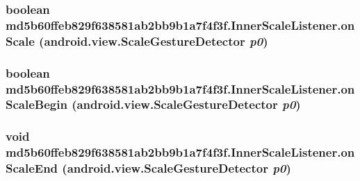 \hypertarget{classmd5b60ffeb829f638581ab2bb9b1a7f4f3f_1_1_inner_scale_listener_9541f867e31a3ee001b6454b9dd02067}{
\subsubsection[{onScale}]{\setlength{\rightskip}{0pt plus 5cm}boolean md5b60ffeb829f638581ab2bb9b1a7f4f3f.InnerScaleListener.onScale (android.view.ScaleGestureDetector {\em p0})}}
\label{classmd5b60ffeb829f638581ab2bb9b1a7f4f3f_1_1_inner_scale_listener_9541f867e31a3ee001b6454b9dd02067}


\hypertarget{classmd5b60ffeb829f638581ab2bb9b1a7f4f3f_1_1_inner_scale_listener_ce0e9a6c5689492acdb304345237b013}{
\subsubsection[{onScaleBegin}]{\setlength{\rightskip}{0pt plus 5cm}boolean md5b60ffeb829f638581ab2bb9b1a7f4f3f.InnerScaleListener.onScaleBegin (android.view.ScaleGestureDetector {\em p0})}}
\label{classmd5b60ffeb829f638581ab2bb9b1a7f4f3f_1_1_inner_scale_listener_ce0e9a6c5689492acdb304345237b013}


\hypertarget{classmd5b60ffeb829f638581ab2bb9b1a7f4f3f_1_1_inner_scale_listener_d1e5c4a080a15064afa8a879af6de198}{
\subsubsection[{onScaleEnd}]{\setlength{\rightskip}{0pt plus 5cm}void md5b60ffeb829f638581ab2bb9b1a7f4f3f.InnerScaleListener.onScaleEnd (android.view.ScaleGestureDetector {\em p0})}}
\label{classmd5b60ffeb829f638581ab2bb9b1a7f4f3f_1_1_inner_scale_listener_d1e5c4a080a15064afa8a879af6de198}




